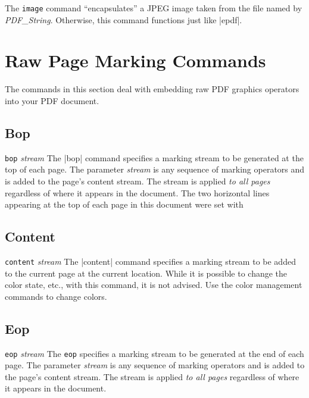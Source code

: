 {\description
The {\tt image} command ``encapsulates'' a JPEG image
taken from the file named by {\it PDF\_String}.
Otherwise, this command functions just like |epdf|.

\section{Raw Page Marking Commands}
The commands in this section deal with embedding
raw PDF graphics operators into your PDF document.

\subsection{Bop}
\syntax
{\tt bop} {\it stream}
\description
The |bop| command specifies a marking
stream to be generated at the top of each page.
The parameter {\it stream} is any sequence
of marking operators and is added to the page's content stream.  
The stream is applied {\it to all pages} regardless
of where it appears in the document.
\example  The two horizontal lines appearing
at the top of each page in this document
were set with
\begintt
{}
\endtt
{}

\subsection{Content}
\syntax
{\tt content} {\it stream}
\description
The |content| command specifies a marking
stream to be added to the current page at
the current location.  While it
is possible to change the color
state, etc., with this command, it is
not advised.  Use the color management
commands to change colors.


\subsection{Eop}
\syntax
\beginlist
{\tt eop} {\it stream}
\endlist
\description
The {\tt eop} specifies a marking stream to be generated at the end
of each page. The parameter {\it stream} is any sequence
of marking operators and is added to the page's content stream.  
The stream is applied {\it to all pages} regardless
of where it appears in the document.

}
